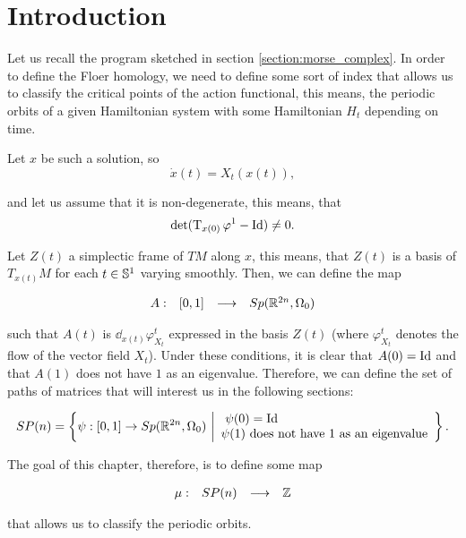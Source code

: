 \section{Introduction}

Let us recall the program sketched in section \ref{section:morse_complex}. In order to define the Floer homology, we need to define some sort of index that allows us to classify the critical points of the action functional, this means, the periodic orbits of a given Hamiltonian system with some Hamiltonian $H_t$ depending on time.

Let $x$ be such a solution, so
\[\dot{x}(t) = X_t(x(t)) ,\]

and let us assume that it is non-degenerate, this means, that
\[\text{det}(\operatorname T_{x(0)} \varphi^1 - \text{Id}) \neq 0 .\]

Let $Z(t)$ a simplectic frame of $TM$ along $x$, this means, that $Z(t)$ is a basis of $T_{x(t)}M$ for each $t \in \mathbb{S}^1$ varying smoothly. Then, we can define the map

\[\begin{array}{rccc} A : & [0,1] & \longrightarrow & Sp(\mathbb{R}^{2n},\Omega_0) \end{array}\]

such that $A(t)$ is $\dd_{x(t)} \varphi_{X_t}^t$ expressed in the basis $Z(t)$ (where $\varphi_{X_t}^t$ denotes the flow of the vector field $X_t$). Under these conditions, it is clear that $A(0) = \text{Id}$ and that $A(1)$ does not have $1$ as an eigenvalue. Therefore, we can define the set of paths of matrices that will interest us in the following sections:

\[SP(n) = \left\{ \psi : [0,1] \rightarrow Sp(\mathbb{R}^{2n},\Omega_0) \ \bigg| \begin{array}{l} \ \psi(0) = \text{Id} \\ \psi(1) \text{ does not have 1 as an eigenvalue} \end{array} \right\} .\]

The goal of this chapter, therefore, is to define some map

\[\begin{array}{rccc} \mu : & SP(n) & \longrightarrow & \mathbb{Z} \end{array}\]

that allows us to classify the periodic orbits.
